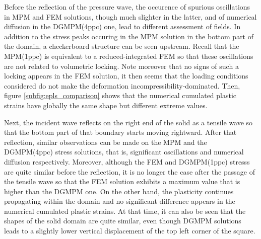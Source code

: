 Before the reflection of the pressure wave, the occurence of spurious oscillations in MPM and FEM solutions, though much slighter in the latter, and of numerical diffusion in the DGMPM(4ppc) one, lead to different assessment of fields.
In addition to the stress peaks occuring in the MPM solution in the bottom part of the domain, a checkerboard structure can be seen upstream.
Recall that the MPM(1ppc) is equivalent to a reduced-integrated FEM so that these oscillations are not related to volumetric locking.
Note moreover that no signs of such a locking appears in the FEM solution, it then seems that the loading conditions considered do not make the deformation incompressibility-dominated.
Then, figure \ref{subfig:epls_comparison} shows that the numerical cumulated plastic strains have globally the same shape but different extreme values.
%   

Next, the incident wave reflects on the right end of the solid as a tensile wave so that the bottom part of that boundary starts moving rightward.
After that reflection, similar observations can be made on the MPM and the DGMPM(4ppc) stress solutions, that is, significant oscillations and numerical diffusion respectively.
Moreover, although the FEM and DGMPM(1ppc) stresss are quite similar before the reflection, it is no longer the case after the passage of the tensile wave so that the FEM solution exhibits a maximum value that is higher than the DGMPM one.
On the other hand, the plasticity continues propagating within the domain and no significant difference appears in the numerical cumulated plastic strains.
At that time, it can also be seen that the shapes of the solid domain are quite similar, even though DGMPM solutions leads to a slightly lower vertical displacement of the top left corner of the square.

